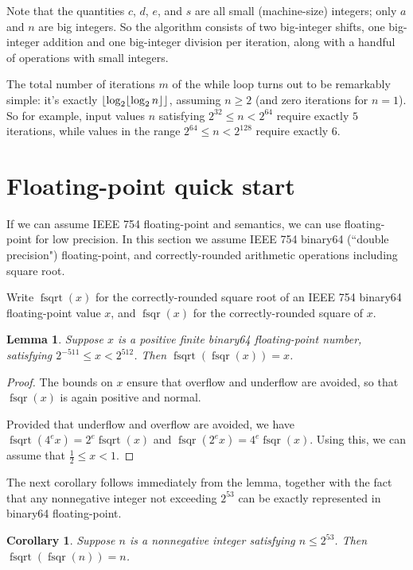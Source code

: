 \documentclass[a4paper]{article}
\DeclarePairedDelimiter\floor{\lfloor}{\rfloor}
\DeclareMathOperator{\fsqrt}{fsqrt}
\DeclareMathOperator{\fsqr}{fsqr}
\theoremstyle{plain}
\newtheorem{lemma}[theorem]{Lemma}
\newtheorem{corollary}[theorem]{Corollary}
\theoremstyle{definition}
\begin{document}
Note that the quantities $c$, $d$, $e$, and $s$ are all small (machine-size)
integers; only $a$ and $n$ are big integers. So the algorithm consists of
two big-integer shifts, one big-integer addition and one big-integer division per
iteration, along with a handful of operations with small integers.

The total number of iterations $m$ of the while loop turns out to be remarkably
simple: it's exactly $\floor{\log_2 \floor{\log_2 n}}$, assuming $n\ge 2$ (and zero
iterations for $n = 1$). So
for example, input values $n$ satisfying $2^{32} \le n < 2^{64}$ require exactly
$5$ iterations, while values in the range $2^{64} \le n < 2^{128}$ require
exactly $6$.


\section{Floating-point quick start}

If we can assume IEEE 754 floating-point and semantics, we can use
floating-point for low precision. In this section we assume IEEE 754
binary64 (``double precision") floating-point, and correctly-rounded
arithmetic operations including square root.

Write $\fsqrt(x)$ for the correctly-rounded square root of an IEEE 754 binary64
floating-point value $x$, and $\fsqr(x)$ for the correctly-rounded square
of $x$.

\begin{lemma}
  Suppose $x$ is a positive finite binary64 floating-point number, satisfying
  $2^{-511} \le x < 2^{512}$. Then $\fsqrt(\fsqr(x)) = x$.
\end{lemma}

\begin{proof}
  The bounds on $x$ ensure that overflow and underflow are avoided, so
  that $\fsqr(x)$ is again positive and normal.

  Provided that underflow and overflow are avoided, we have $\fsqrt(4^e x) =
  2^e \fsqrt(x)$ and $\fsqr(2^e x) = 4^e \fsqr(x)$. Using this, we can
  assume that $\frac 12 \le x < 1$.


\end{proof}

The next corollary follows immediately from the lemma, together with the
fact that any nonnegative integer not exceeding $2^{53}$ can be exactly
represented in binary64 floating-point.

\begin{corollary}
  Suppose $n$ is a nonnegative integer satisfying $n \le 2^{53}$. Then
  $\fsqrt(\fsqr(n)) = n$.
\end{corollary}
\end{document}
